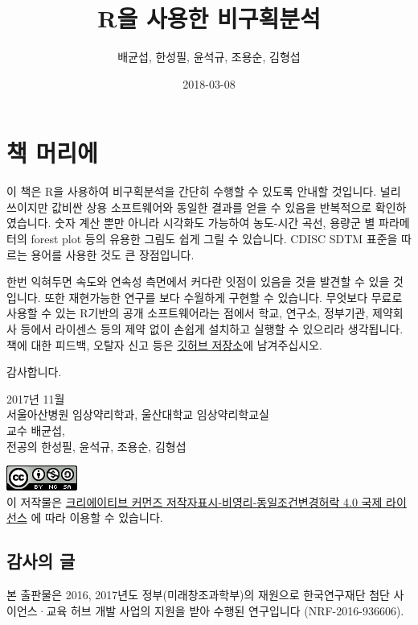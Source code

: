 \documentclass[12pt,]{krantz}
\title{R을 사용한 비구획분석}
\author{배균섭, 한성필, 윤석규, 조용순, 김형섭}
\date{2018-03-08}
\theoremstyle{definition}
\theoremstyle{definition}
\theoremstyle{definition}
\theoremstyle{remark}
\let\BeginKnitrBlock\begin \let\EndKnitrBlock\end
\begin{document}
\maketitle

{
\hypersetup{linkcolor=black}
\setcounter{tocdepth}{2}
\tableofcontents
}
\chapter*{책 머리에}\label{-}


\href{https://github.com/asancpt/book-ncar}{}

이 책은 R을 사용하여 비구획분석을 간단히 수행할 수 있도록 안내할
것입니다. 널리 쓰이지만 값비싼 상용 소프트웨어와 동일한 결과를 얻을 수
있음을 반복적으로 확인하였습니다. 숫자 계산 뿐만 아니라 시각화도
가능하여 농도-시간 곡선, 용량군 별 파라메터의 forest plot 등의 유용한
그림도 쉽게 그릴 수 있습니다. CDISC SDTM 표준을 따르는 용어를 사용한
것도 큰 장점입니다.

한번 익혀두면 속도와 연속성 측면에서 커다란 잇점이 있음을 것을 발견할 수
있을 것입니다. 또한 재현가능한 연구를 보다 수월하게 구현할 수 있습니다.
무엇보다 무료로 사용할 수 있는 R기반의 공개 소프트웨어라는 점에서 학교,
연구소, 정부기관, 제약회사 등에서 라이센스 등의 제약 없이 손쉽게
설치하고 실행할 수 있으리라 생각됩니다. 책에 대한 피드백, 오탈자 신고
등은 \href{https://github.com/asancpt/book-ncar/issues}{깃허브 저장소}에
남겨주십시오.

감사합니다.

2017년 11월\\
서울아산병원 임상약리학과, 울산대학교 임상약리학교실\\
교수 배균섭,\\
전공의 한성필, 윤석규, 조용순, 김형섭

\includegraphics{assets/cc.png}\\
이 저작물은
\href{http://creativecommons.org/licenses/by-nc-sa/4.0/}{크리에이티브
커먼즈 저작자표시-비영리-동일조건변경허락 4.0 국제 라이선스} 에 따라
이용할 수 있습니다.

\section*{감사의 글}\label{-}


\BeginKnitrBlock{rmdnote}
본 출판물은 2016, 2017년도 정부(미래창조과학부)의 재원으로 한국연구재단
첨단 사이언스·교육 허브 개발 사업의 지원을 받아 수행된 연구입니다
(NRF-2016-936606).
\EndKnitrBlock{rmdnote}
\end{document}
